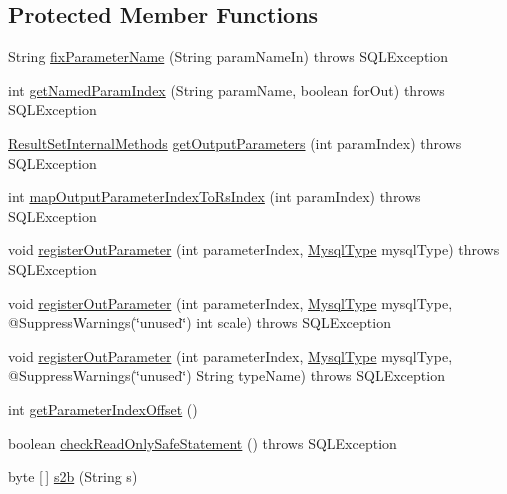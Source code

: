 \subsection*{Protected Member Functions}
\begin{DoxyCompactItemize}
\item 
String \mbox{\hyperlink{classcom_1_1mysql_1_1cj_1_1jdbc_1_1_callable_statement_a1ef44aef1842ec7c4affb25b0baba1d7}{fix\+Parameter\+Name}} (String param\+Name\+In)  throws S\+Q\+L\+Exception 
\item 
int \mbox{\hyperlink{classcom_1_1mysql_1_1cj_1_1jdbc_1_1_callable_statement_a72e0a1ec0c24599bb2d3ee4f52ec616c}{get\+Named\+Param\+Index}} (String param\+Name, boolean for\+Out)  throws S\+Q\+L\+Exception 
\item 
\mbox{\hyperlink{interfacecom_1_1mysql_1_1cj_1_1jdbc_1_1result_1_1_result_set_internal_methods}{Result\+Set\+Internal\+Methods}} \mbox{\hyperlink{classcom_1_1mysql_1_1cj_1_1jdbc_1_1_callable_statement_af73a9e62e30b97e9b02f519a09749fbf}{get\+Output\+Parameters}} (int param\+Index)  throws S\+Q\+L\+Exception 
\item 
int \mbox{\hyperlink{classcom_1_1mysql_1_1cj_1_1jdbc_1_1_callable_statement_a8aa76ccabbeebdb8c0430151845e6495}{map\+Output\+Parameter\+Index\+To\+Rs\+Index}} (int param\+Index)  throws S\+Q\+L\+Exception 
\item 
void \mbox{\hyperlink{classcom_1_1mysql_1_1cj_1_1jdbc_1_1_callable_statement_affc71b6220a237feb94f842a2347d1da}{register\+Out\+Parameter}} (int parameter\+Index, \mbox{\hyperlink{enumcom_1_1mysql_1_1cj_1_1_mysql_type}{Mysql\+Type}} mysql\+Type)  throws S\+Q\+L\+Exception 
\item 
void \mbox{\hyperlink{classcom_1_1mysql_1_1cj_1_1jdbc_1_1_callable_statement_af0005c4b8cc3fc565a380073c5a095d1}{register\+Out\+Parameter}} (int parameter\+Index, \mbox{\hyperlink{enumcom_1_1mysql_1_1cj_1_1_mysql_type}{Mysql\+Type}} mysql\+Type, @Suppress\+Warnings(\char`\"{}unused\char`\"{}) int scale)  throws S\+Q\+L\+Exception 
\item 
void \mbox{\hyperlink{classcom_1_1mysql_1_1cj_1_1jdbc_1_1_callable_statement_adfc6052606e5e137e89a1c9af6e61b99}{register\+Out\+Parameter}} (int parameter\+Index, \mbox{\hyperlink{enumcom_1_1mysql_1_1cj_1_1_mysql_type}{Mysql\+Type}} mysql\+Type, @Suppress\+Warnings(\char`\"{}unused\char`\"{}) String type\+Name)  throws S\+Q\+L\+Exception 
\item 
int \mbox{\hyperlink{classcom_1_1mysql_1_1cj_1_1jdbc_1_1_callable_statement_a74bf521ae6b025c69dd8c2ab02a0d318}{get\+Parameter\+Index\+Offset}} ()
\item 
boolean \mbox{\hyperlink{classcom_1_1mysql_1_1cj_1_1jdbc_1_1_callable_statement_a105cffb3cb721f8d1228988106427140}{check\+Read\+Only\+Safe\+Statement}} ()  throws S\+Q\+L\+Exception 
\item 
byte \mbox{[}$\,$\mbox{]} \mbox{\hyperlink{classcom_1_1mysql_1_1cj_1_1jdbc_1_1_callable_statement_a7d985ddf5b86f79d5133d106d26dce95}{s2b}} (String s)
\end{DoxyCompactItemize}
